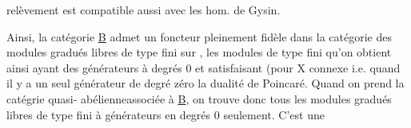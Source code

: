  \hand{[}  relèvement est compatible aussi avec les hom. de Gysin.\hand{]}

Ainsi, la catégorie \underline{B} admet un foncteur pleinement fidèle dans la
catégorie des modules gradués libres de type fini sur \hand{$\Lambda$}, les modules
de type fini qu'on obtient ainsi ayant des générateurs à degrés \hand{$<$} 0 et
satisfaisant (pour X connexe i.e. quand il y a un seul générateur de
degré zéro\hand{)} la dualité de Poincaré. Quand on prend la catégrie quasi-%
abélienne\hand{-}associée à \underline{B}, on trouve donc tous les modules gradués libres
de type fini à générateurs  en degrés \hand{$\leq$} 0 seulement. C'est une

